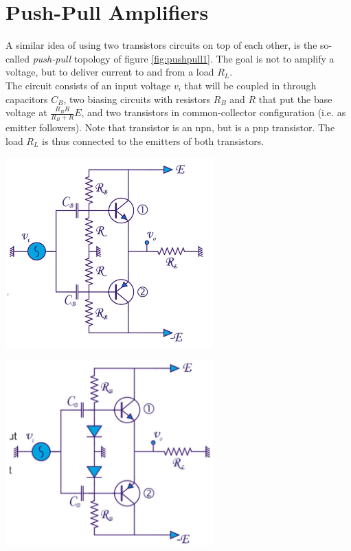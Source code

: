 \section{Push-Pull Amplifiers}
\label{sec:push_pull}
A similar idea of using two transistors circuits on top of each other, is the so-called \emph{push-pull} topology of figure \ref{fig:pushpull1}. The goal is not to amplify a voltage, but to deliver current to and from a load $R_L$.\\
The circuit consists of an input voltage $v_i$ that will be coupled in through capacitors $C_B$, two biasing circuits with resistors $R_B$ and $R$ that put the base voltage at $\frac{R_B R}{R_B + R} E$, and two transistors in common-collector configuration (i.e. as emitter followers). Note that transistor  is an npn, but  is a pnp transistor. The load $R_L$ is thus connected to the emitters of both transistors.\\
\begin{minipage}{.5\textwidth}
	\centering
	\includegraphics[width=8cm]{figures/ch09/pushpull1.jpg}
	\label{fig:pushpull1}
\end{minipage}%
\begin{minipage}{.5\textwidth}
	\centering
	\includegraphics[width=8cm]{figures/ch09/pushpull2.jpg}
	\label{fig:pushpull2}
\end{minipage}
